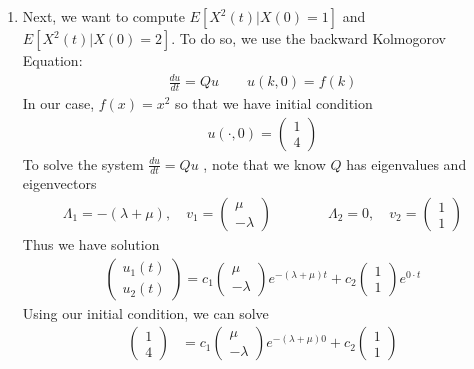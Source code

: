 \documentclass[12pt]{article}
\theoremstyle{plain}
\theoremstyle{definition}
\theoremstyle{remark}
\begin{document}
\begin{enumerate}
\begin{enumerate}
  \item %
    Next, we want to compute $E[X^2(t)|X(0)=1]$ and $E[X^2(t)|X(0)=2]$.
    To do so, we use the backward Kolmogorov Equation:
    \begin{align*}
      \frac{du}{dt} = Qu \qquad u(k,0)=f(k)
    \end{align*}
    In our case, $f(x)=x^2$ so that we have initial condition
    \begin{align*}
      u(\cdot,0) =
        \begin{pmatrix}
          1 \\ 4
        \end{pmatrix}
    \end{align*}
    To solve the system $\frac{du}{dt} = Qu$ , note that we know $Q$ has
    eigenvalues and eigenvectors
    \begin{align*}
      \Lambda_1 = -(\lambda+\mu), \quad
        v_1 = \begin{pmatrix} \mu \\ -\lambda \end{pmatrix}
      \qquad \qquad
      \Lambda_2 = 0, \quad
        v_2 = \begin{pmatrix} 1 \\ 1 \end{pmatrix}
    \end{align*}
    Thus we have solution
    \begin{align*}
      \begin{pmatrix}
        u_1(t) \\ u_2(t)
      \end{pmatrix}
      = c_1 \begin{pmatrix} \mu \\ -\lambda \end{pmatrix}
        e^{-(\lambda+\mu)t}
        + c_2 \begin{pmatrix} 1 \\ 1 \end{pmatrix} e^{0\cdot t}
    \end{align*}
    Using our initial condition, we can solve
    \begin{align*}
      \begin{pmatrix} 1 \\ 4 \end{pmatrix}
      &= c_1 \begin{pmatrix} \mu \\ -\lambda \end{pmatrix}
        e^{-(\lambda+\mu)0}
        + c_2 \begin{pmatrix} 1 \\ 1 \end{pmatrix}\\

\end{align*}
\end{enumerate}
\end{enumerate}
\end{document}
